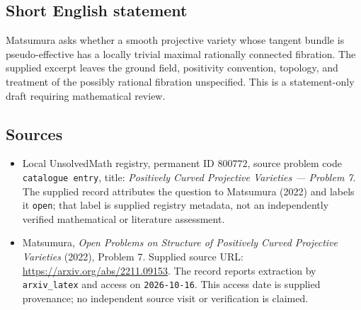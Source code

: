 \documentclass[11pt]{article}
\begin{document}
\subsection{Short English statement}
Matsumura asks whether a smooth projective variety whose tangent bundle is pseudo-effective has a locally trivial maximal rationally connected fibration. The supplied excerpt leaves the ground field, positivity convention, topology, and treatment of the possibly rational fibration unspecified. This is a statement-only draft requiring mathematical review.
\subsection{Sources}
\begin{itemize}
\item Local UnsolvedMath registry, permanent ID \(800772\), source problem code \texttt{catalogue entry}, title: \emph{Positively Curved Projective Varieties --- Problem 7}. The supplied record attributes the question to Matsumura (2022) and labels it \texttt{open}; that label is supplied registry metadata, not an independently verified mathematical or literature assessment.
\item Matsumura, \emph{Open Problems on Structure of Positively Curved Projective Varieties} (2022), Problem 7. Supplied source URL: \url{https://arxiv.org/abs/2211.09153}. The record reports extraction by \texttt{arxiv\_latex} and access on \texttt{2026-10-16}. This access date is supplied provenance; no independent source visit or verification is claimed.
\end{itemize}
\end{document}
